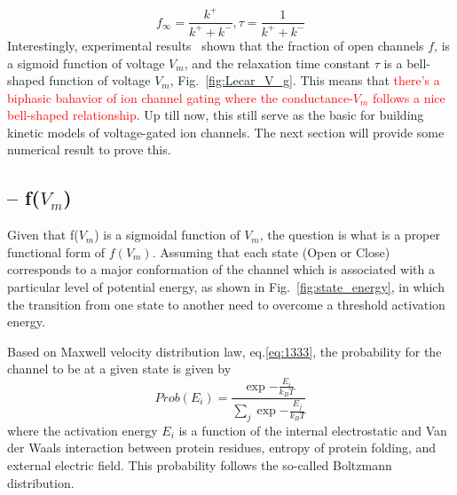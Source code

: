 \begin{equation}
  \label{eq:79}
  f_{\infty} = \frac{k^+}{k^++k^-}, \tau = \frac{1}{k^++k^-}
\end{equation}
Interestingly, experimental
  results~\citep{lecar1975mcg} shown that the fraction of open
  channels $f$, is a sigmoid function of voltage $V_m$, and the
  relaxation time constant $\tau$ is a bell-shaped function of voltage
  $V_m$,
Fig.~\ref{fig:Lecar_V_g}. This means that \textcolor{red}{there's a biphasic
bahavior of ion channel gating where the conductance-$V_m$ follows a nice bell-shaped
relationship}. Up till now, this still serve as the basic for building kinetic
models of voltage-gated ion channels. The next section will provide some
numerical result to prove this.

\subsection{-- f($V_m$)}
\label{sec:fv_m}

Given that f($V_m$) is a sigmoidal function of $V_m$, the question is what is a
proper functional form of $f(V_m)$. Assuming that each state (Open or Close)
corresponds to a major conformation of the channel which is associated with a
particular level of potential energy, as shown in Fig.~\ref{fig:state_energy},
in which the transition from one state to another need to overcome a threshold
activation energy.

Based on Maxwell velocity distribution law, eq.\ref{eq:1333},
the probability for the channel to be at a given state is given by
\begin{equation}
  \label{eq:690}
  Prob(E_i) = \frac{\exp{-\frac{E_i}{k_BT}}}{\sum_j\exp{-\frac{E_j}{k_BT}}}
\end{equation}
where the activation energy $E_i$ is a function of the internal
electrostatic and Van der Waals interaction between protein residues,
entropy of protein folding, and external electric field. This
probability follows the so-called Boltzmann distribution.


